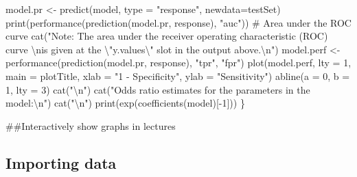 \documentclass[
  letterpaper,
  DIV=11,
  numbers=noendperiod]{scrartcl}
\newenvironment{Shaded}{\begin{snugshade}}{\end{snugshade}}
\newcommand{\AttributeTok}[1]{\textcolor[rgb]{0.40,0.45,0.13}{#1}}
\newcommand{\CommentTok}[1]{\textcolor[rgb]{0.37,0.37,0.37}{#1}}
\newcommand{\DecValTok}[1]{\textcolor[rgb]{0.68,0.00,0.00}{#1}}
\newcommand{\FunctionTok}[1]{\textcolor[rgb]{0.28,0.35,0.67}{#1}}
\newcommand{\NormalTok}[1]{\textcolor[rgb]{0.00,0.23,0.31}{#1}}
\newcommand{\OtherTok}[1]{\textcolor[rgb]{0.00,0.23,0.31}{#1}}
\newcommand{\SpecialCharTok}[1]{\textcolor[rgb]{0.37,0.37,0.37}{#1}}
\newcommand{\StringTok}[1]{\textcolor[rgb]{0.13,0.47,0.30}{#1}}
\begin{document}
\begin{Shaded}
\begin{Highlighting}[]
\NormalTok{  model.pr }\OtherTok{\textless{}{-}} \FunctionTok{predict}\NormalTok{(model, }\AttributeTok{type =} \StringTok{"response"}\NormalTok{, }\AttributeTok{newdata=}\NormalTok{testSet)}
  \FunctionTok{print}\NormalTok{(}\FunctionTok{performance}\NormalTok{(}\FunctionTok{prediction}\NormalTok{(model.pr, response), }\StringTok{"auc"}\NormalTok{))  }\CommentTok{\# Area under the ROC curve}
  \FunctionTok{cat}\NormalTok{(}\StringTok{"Note: The area under the receiver operating characteristic (ROC) curve }\SpecialCharTok{\textbackslash{}n}\StringTok{is given at the }\SpecialCharTok{\textbackslash{}"}\StringTok{y.values}\SpecialCharTok{\textbackslash{}"}\StringTok{ slot in the output above.}\SpecialCharTok{\textbackslash{}n}\StringTok{"}\NormalTok{)}
\NormalTok{  model.perf }\OtherTok{\textless{}{-}} \FunctionTok{performance}\NormalTok{(}\FunctionTok{prediction}\NormalTok{(model.pr, response), }\StringTok{"tpr"}\NormalTok{, }\StringTok{"fpr"}\NormalTok{)}
  \FunctionTok{plot}\NormalTok{(model.perf, }\AttributeTok{lty =} \DecValTok{1}\NormalTok{, }\AttributeTok{main =}\NormalTok{ plotTitle, }\AttributeTok{xlab =} \StringTok{"1 {-} Specificity"}\NormalTok{, }\AttributeTok{ylab =} \StringTok{"Sensitivity"}\NormalTok{)}
  \FunctionTok{abline}\NormalTok{(}\AttributeTok{a =} \DecValTok{0}\NormalTok{, }\AttributeTok{b =} \DecValTok{1}\NormalTok{, }\AttributeTok{lty =} \DecValTok{3}\NormalTok{)}
  \FunctionTok{cat}\NormalTok{(}\StringTok{"}\SpecialCharTok{\textbackslash{}n}\StringTok{"}\NormalTok{)}
  \FunctionTok{cat}\NormalTok{(}\StringTok{"Odds ratio estimates for the parameters in the model:}\SpecialCharTok{\textbackslash{}n}\StringTok{"}\NormalTok{)}
  \FunctionTok{cat}\NormalTok{(}\StringTok{"}\SpecialCharTok{\textbackslash{}n}\StringTok{"}\NormalTok{)}
  \FunctionTok{print}\NormalTok{(}\FunctionTok{exp}\NormalTok{(}\FunctionTok{coefficients}\NormalTok{(model)[}\SpecialCharTok{{-}}\DecValTok{1}\NormalTok{]))}
\NormalTok{\}}
\end{Highlighting}
\end{Shaded}

\#\#Interactively show graphs in lectures

\subsection{Importing data}\label{importing-data}
\end{document}
